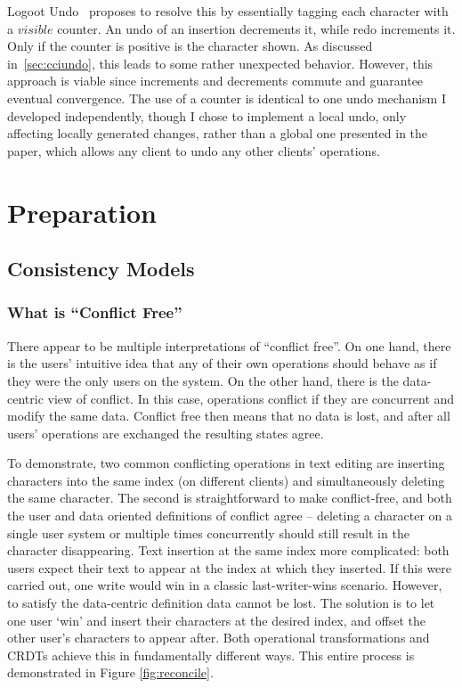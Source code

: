 \documentclass[12pt,a4paper,twoside,openright]{report}
\begin{document}
Logoot Undo~\cite{weiss2010undo} proposes to resolve this by essentially tagging each character with a $visible$ counter. An undo of an insertion decrements it, while redo increments it. Only if the counter is positive is the character shown. As discussed in~\cref{sec:cciundo}, this leads to some rather unexpected behavior. However, this approach is viable since increments and decrements commute and guarantee eventual convergence. The use of a counter is identical to one undo mechanism I developed independently, though I chose to implement a local undo, only affecting locally generated changes, rather than a global one presented in the paper, which allows any client to undo any other clients' operations.


\chapter{Preparation}


\section{Consistency Models}

	\subsection{What is ``Conflict Free''}
	
	There appear to be multiple interpretations of ``conflict free''. On one hand, there is the users' intuitive idea that any of their own operations should behave as if they were the only users on the system. On the other hand, there is the data-centric view of conflict. In this case, operations conflict if they are concurrent and modify the same data. Conflict free then means that no data is lost, and after all users' operations are exchanged the resulting states agree.
	
	To demonstrate, two common conflicting operations in text editing are inserting characters into the same index (on different clients) and simultaneously deleting the same character. The second is straightforward to make conflict-free, and both the user and data oriented definitions of conflict agree -- deleting a character on a single user system or multiple times concurrently should still result in the character disappearing. Text insertion at the same index more complicated: both users expect their text to appear at the index at which they inserted. If this were carried out, one write would win in a classic last-writer-wins scenario. However, to satisfy the data-centric definition data cannot be lost. The solution is to let one user `win' and insert their characters at the desired index, and offset the other user's characters to appear after. Both operational transformations and CRDTs achieve this in fundamentally different ways. This entire process is demonstrated in Figure \ref{fig:reconcile}.
	
\end{document}
